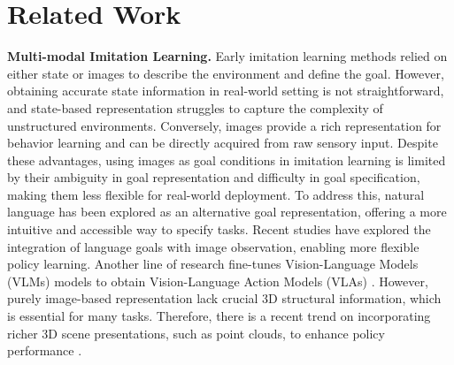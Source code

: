 \section{Related Work} \label{sec: related work}

\textbf{Multi-modal Imitation Learning.} 
Early imitation learning methods relied on either state \cite{schaal1996learning, ho2016generative, torabi2018behavioral} or images \cite{pomerleau1988alvinn, lynch2020learning, young2021visual} to describe the environment and define the goal. However, obtaining accurate state information in real-world setting is not straightforward, and state-based representation struggles to capture the complexity of unstructured environments. Conversely, images provide a rich representation for behavior learning \cite{robomimic2021} and can be directly acquired from raw sensory input. Despite these advantages, using images as goal conditions in imitation learning is limited by their ambiguity in goal representation and difficulty in goal specification, making them less flexible for real-world deployment.
To address this, natural language has been explored as an alternative goal representation, offering a more intuitive and accessible way to specify tasks. Recent studies \cite{shridhar2022cliport,reuss2024multimodal, bharadhwaj2024roboagent} have explored the integration of language goals with image observation, enabling more flexible policy learning. Another line of research fine-tunes Vision-Language Models (VLMs) models to obtain Vision-Language Action Models (VLAs) \cite{kim2024openvlaopensourcevisionlanguageactionmodel, li2023vision, li2023generalist}. However, purely image-based representation lack crucial 3D structural information, which is essential for many tasks. Therefore, there is a recent trend on incorporating richer 3D scene presentations, such as point clouds, to enhance policy performance \cite{ke20243d, Ze2024DP3}. 

